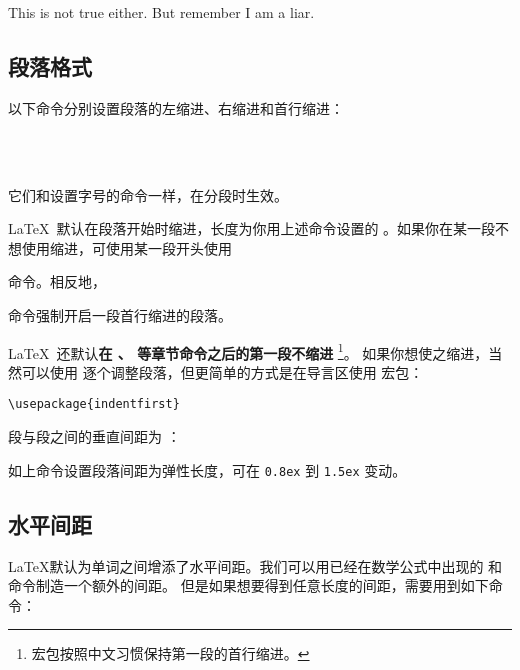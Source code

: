 \begin{example}
{\Large This is not true either.
But remember I am a liar.}\par
\end{example}

\subsection{段落格式}

以下命令分别设置段落的左缩进、右缩进和首行缩进：
\begin{command}
\marg*{20pt}  \\
\marg*{20pt} \\
\marg*{2em}
\end{command}

它们和设置字号的命令一样，在分段时生效。

\LaTeX\ 默认在段落开始时缩进，长度为你用上述命令设置的 。如果你在某一段不想使用缩进，可使用某一段开头使用
\begin{command}
\end{command}
命令。相反地，
\begin{command}
\end{command}
命令强制开启一段首行缩进的段落。

\LaTeX\ 还默认\textbf{在 、 等章节命令之后的第一段不缩进}%
\footnote{ 宏包按照中文习惯保持第一段的首行缩进。}。
如果你想使之缩进，当然可以使用  逐个调整段落，但更简单的方式是在导言区使用  宏包：
\begin{verbatim}
\usepackage{indentfirst}
\end{verbatim}

段与段之间的垂直间距为 ：
\begin{command}
\end{command}

如上命令设置段落间距为弹性长度，可在 \texttt{0.8ex} 到 \texttt{1.5ex} 变动。

\subsection{水平间距}

\LaTeX 默认为单词之间增添了水平间距。我们可以用已经在数学公式中出现的  和  命令制造一个额外的间距。
但是如果想要得到任意长度的间距，需要用到如下命令：
\begin{command}
\end{command}

